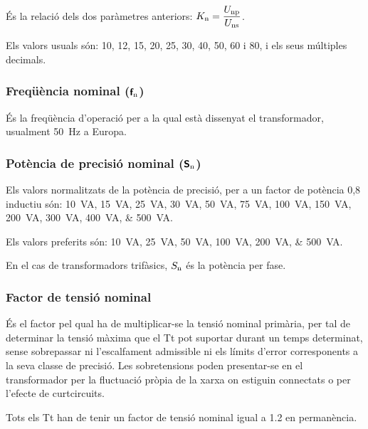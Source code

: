  És la relació  dels dos paràmetres anteriors: $K_\mathrm{n} = \dfrac{U_\mathrm{np}}{U_\mathrm{ns}}$.

 Els valors usuals són: 10, 12, 15, 20, 25, 30, 40, 50, 60 i 80, i els seus múltiples decimals.

\subsubsection{Freqüència nominal (${\boldsymbol{\mathsf{f_\text{n}}}}$)}

 És la freqüència d'operació per a la qual  està dissenyat el transformador, usualment \qty{50}{Hz} a Europa.

\subsubsection{Potència de precisió nominal (${\boldsymbol{\mathsf{S_\text{n}}}}$)}

Els valors normalitzats de la potència de precisió, per
a un factor de potència 0,8 inductiu són: \qtylist{10; 15; 25; 30; 50; 75; 100; 150;
 200; 300; 400; 500}{VA}.

 Els valors preferits són: \qtylist{10; 25; 50; 100; 200; 500}{VA}.

En el cas de transformadors trifàsics, $S_\mathrm{n}$ és la potència per fase.

\subsubsection{Factor de tensió nominal}

 És el factor pel qual ha de
multiplicar-se la tensió nominal primària, per tal de determinar la
tensió màxima que el Tt pot suportar durant un temps determinat,
sense sobrepassar ni l'escalfament admissible ni els límits d'error
corresponents a la seva classe de precisió. Les sobretensions poden
presentar-se en el transformador  per la fluctuació
pròpia de la xarxa on estiguin connectats o per l'efecte de curtcircuits.

Tots els  Tt han de tenir un factor de tensió nominal igual a \num{1,2} en permanència.

